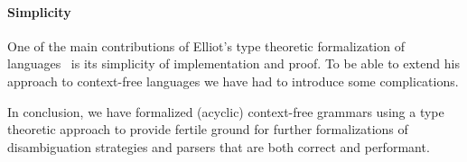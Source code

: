 \paragraph{Simplicity}
One of the main contributions of Elliot's type theoretic formalization of languages~\cite{conal-languages} is its simplicity of implementation and proof. To be able to extend his approach to context-free languages we have had to introduce some complications.
\medbreak

In conclusion, we have formalized (acyclic) context-free grammars using a type theoretic approach to provide fertile ground for further formalizations of disambiguation strategies and parsers that are both correct and performant.
